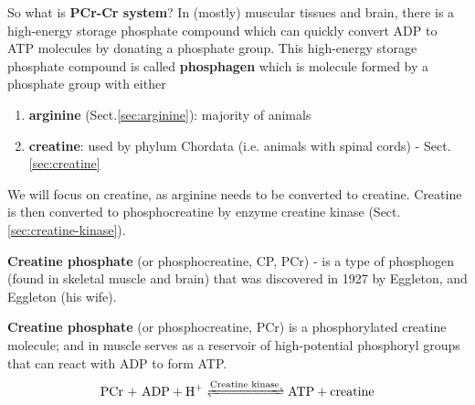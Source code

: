 \begin{mdframed}

So what is {\bf PCr-Cr system}? In (mostly) muscular tissues and brain, there is
a high-energy storage phosphate compound which can quickly convert ADP to ATP
molecules by donating a phosphate group. This high-energy storage phosphate
compound is called {\bf phosphagen} which is molecule formed by a phosphate
group with either
\begin{enumerate}
  \item {\bf arginine} (Sect.\ref{sec:arginine}): majority of animals

  \item {\bf creatine}: used by phylum Chordata (i.e. animals with spinal
  cords) - Sect.\ref{sec:creatine}
\end{enumerate}

We will focus on creatine, as arginine needs to be converted to creatine.
Creatine is then converted to phosphocreatine by enzyme creatine kinase
(Sect.\ref{sec:creatine-kinase}).

{\bf Creatine phosphate} (or phosphocreatine, CP, PCr) - is a type of phosphogen
(found in skeletal muscle and brain) that was discovered in 1927 by Eggleton,
and Eggleton (his wife).

\end{mdframed}


{\bf Creatine phosphate} (or phosphocreatine, PCr) is a phosphorylated creatine
molecule; and in muscle serves as a reservoir of high-potential phosphoryl
groups that can react with ADP to form ATP.
\begin{equation}
  \label{eq:3}
  \text{PCr + ADP} + \ce{H+ <=>[\text{Creatine kinase}] ATP +
    creatine }
\end{equation}

